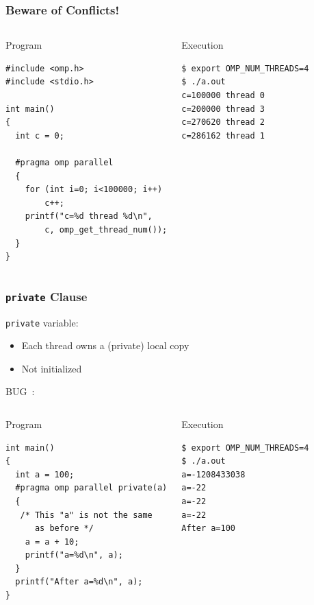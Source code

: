 \documentclass{beamer}
\begin{document}
\begin{frame}[fragile=singleslide]
  \frametitle{Beware of Conflicts!}
  
  \small
  \begin{columns}[t]
  \column{5cm}
\begin{block}{Program}
\begin{verbatim}
#include <omp.h>
#include <stdio.h>

int main()
{
  int c = 0;

  #pragma omp parallel
  {  
    for (int i=0; i<100000; i++)
        c++;
    printf("c=%d thread %d\n", 
        c, omp_get_thread_num());
  }
}
\end{verbatim}
\end{block}
    
    
    \column{5cm}
\begin{block}{Execution}    
\begin{verbatim}
$ export OMP_NUM_THREADS=4
$ ./a.out
c=100000 thread 0
c=200000 thread 3
c=270620 thread 2
c=286162 thread 1
\end{verbatim}
\end{block}    
  \end{columns}
\normalsize
\end{frame}


\begin{frame}[fragile=singleslide]
  \frametitle{\texttt{private} Clause}

 \texttt{private} variable:
  \begin{itemize}
  \item Each thread owns a (private) local copy
  \item \alert{Not initialized}
  \end{itemize}

\medskip

BUG~:
\begin{columns}[t]
  \column{5cm}
  
\begin{block}{Program}
\begin{verbatim}
int main()
{
  int a = 100;
  #pragma omp parallel private(a)
  {
   /* This "a" is not the same
      as before */
    a = a + 10;
    printf("a=%d\n", a);
  }
  printf("After a=%d\n", a);
}
\end{verbatim}
\end{block}

  
  \column{5cm}
\begin{block}{Execution}
\small
\begin{verbatim} 
$ export OMP_NUM_THREADS=4
$ ./a.out 
a=-1208433038
a=-22
a=-22
a=-22
After a=100
\end{verbatim}
\end{block}  
\end{columns}
\end{frame}
\end{document}
